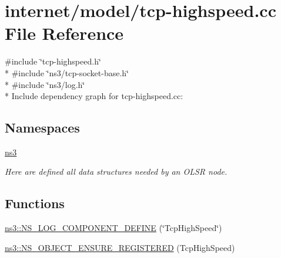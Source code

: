 \hypertarget{tcp-highspeed_8cc}{}\section{internet/model/tcp-\/highspeed.cc File Reference}
\label{tcp-highspeed_8cc}
{\ttfamily \#include \char`\"{}tcp-\/highspeed.\+h\char`\"{}}\\*
{\ttfamily \#include \char`\"{}ns3/tcp-\/socket-\/base.\+h\char`\"{}}\\*
{\ttfamily \#include \char`\"{}ns3/log.\+h\char`\"{}}\\*
Include dependency graph for tcp-\/highspeed.cc\+:
\subsection*{Namespaces}
\begin{DoxyCompactItemize}
\item 
 \hyperlink{namespacens3}{ns3}
\begin{DoxyCompactList}\small\item\em Here are defined all data structures needed by an O\+L\+SR node. \end{DoxyCompactList}\end{DoxyCompactItemize}
\subsection*{Functions}
\begin{DoxyCompactItemize}
\item 
\hyperlink{namespacens3_a3afff7f11409a04c0bc9fe6ba67dfe5d}{ns3\+::\+N\+S\+\_\+\+L\+O\+G\+\_\+\+C\+O\+M\+P\+O\+N\+E\+N\+T\+\_\+\+D\+E\+F\+I\+NE} (\char`\"{}Tcp\+High\+Speed\char`\"{})
\item 
\hyperlink{namespacens3_a03dc68959ba3ac1d030ab740ce7f2b18}{ns3\+::\+N\+S\+\_\+\+O\+B\+J\+E\+C\+T\+\_\+\+E\+N\+S\+U\+R\+E\+\_\+\+R\+E\+G\+I\+S\+T\+E\+R\+ED} (Tcp\+High\+Speed)
\end{DoxyCompactItemize}
